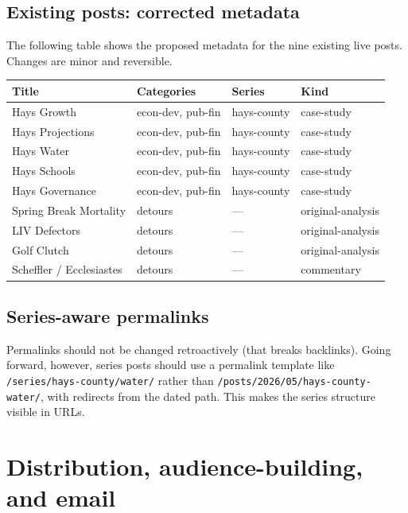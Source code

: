 \documentclass[11pt]{article}
\begin{document}
\subsection{Existing posts: corrected metadata}

The following table shows the proposed metadata for the nine
existing live posts. Changes are minor and reversible.

\begin{center}
\small
\begin{tabular}{p{1.6in}p{0.9in}p{1.0in}p{1.0in}}
\toprule
Title & Categories & Series & Kind \\
\midrule
Hays Growth        & econ-dev, pub-fin & hays-county    & case-study \\
Hays Projections   & econ-dev, pub-fin & hays-county    & case-study \\
Hays Water         & econ-dev, pub-fin & hays-county    & case-study \\
Hays Schools       & econ-dev, pub-fin & hays-county    & case-study \\
Hays Governance    & econ-dev, pub-fin & hays-county    & case-study \\
\midrule
Spring Break Mortality & detours       & ---            & original-analysis \\
LIV Defectors          & detours       & ---            & original-analysis \\
Golf Clutch            & detours       & ---            & original-analysis \\
Scheffler / Ecclesiastes & detours     & ---            & commentary \\
\bottomrule
\end{tabular}
\end{center}

\subsection{Series-aware permalinks}

Permalinks should not be changed retroactively (that breaks
backlinks). Going forward, however, series posts should use a
permalink template like
\texttt{/series/hays-county/water/} rather than
\texttt{/posts/2026/05/hays-county-water/}, with redirects from
the dated path. This makes the series structure visible in URLs.

\section{Distribution, audience-building, and email}
\end{document}
